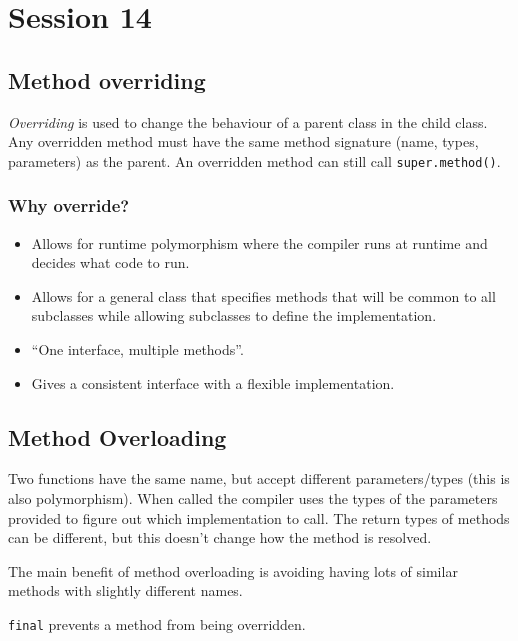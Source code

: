 \section{Session 14}\label{sec:session_14}

\subsection{Method overriding}\label{sub:method_overriding}

\emph{Overriding} is used to change the behaviour of a parent class in the child class.
Any overridden method must have the same method signature (name, types, parameters) as the parent.
An overridden method can still call \texttt{super.method()}.

\subsubsection{Why override?}\label{ssub:why_override_}

\begin{itemize}
    \item Allows for runtime polymorphism where the compiler runs at runtime and decides what code to run.
    \item Allows for a general class that specifies methods that will be common to all subclasses while allowing subclasses to define the implementation.
    \item ``One interface, multiple methods''.
    \item Gives a consistent interface with a flexible implementation.
\end{itemize}


\subsection{Method Overloading}\label{sub:method_overloading}

Two functions have the same name, but accept different parameters/types (this is also polymorphism).
When called the compiler uses the types of the parameters provided to figure out which implementation to call.
The return types of methods can be different, but this doesn't change how the method is resolved.

The main benefit of method overloading is avoiding having lots of similar methods with slightly different names.

\texttt{final} prevents a method from being overridden.

